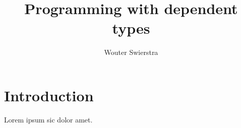 \documentclass[sigplan,10pt,noacm]{acmart}
\begin{document}
\title{Programming with dependent types}
\author{Wouter Swierstra}

\maketitle


\section{Introduction}

Lorem ipsum sic dolor amet.
\end{document}

